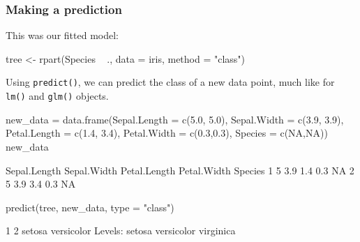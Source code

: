 \documentclass[a4paper]{article}\usepackage[]{graphicx}\usepackage[]{xcolor}
\begin{document}
\subsubsection{Making a prediction}
This was our fitted model:
\begin{Schunk}
\begin{Sinput}
tree <- rpart(Species ~ ., data = iris, method = "class") 
\end{Sinput}
\end{Schunk}
Using \lstinline|predict()|, we can predict the class of a new data point, much like for \lstinline|lm()| and \lstinline|glm()| objects.
\begin{Schunk}
\begin{Sinput}
new_data = data.frame(Sepal.Length = c(5.0, 5.0), 
                      Sepal.Width = c(3.9, 3.9),
                      Petal.Length = c(1.4, 3.4), 
                      Petal.Width = c(0.3,0.3),
                      Species = c(NA,NA))
new_data
\end{Sinput}
\begin{Soutput}
  Sepal.Length Sepal.Width Petal.Length Petal.Width Species
1            5         3.9          1.4         0.3      NA
2            5         3.9          3.4         0.3      NA
\end{Soutput}
\begin{Sinput}
predict(tree, new_data, type = "class")
\end{Sinput}
\begin{Soutput}
         1          2 
    setosa versicolor 
Levels: setosa versicolor virginica
\end{Soutput}
\end{Schunk}
\end{document}
